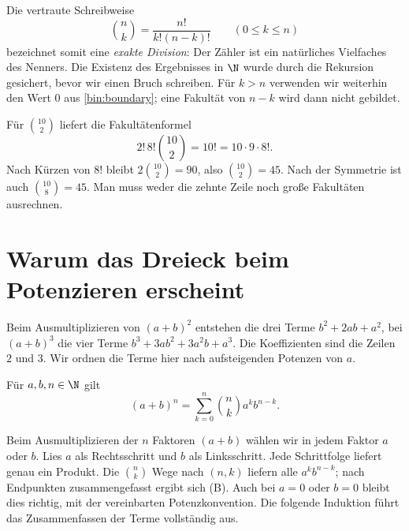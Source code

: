 Die vertraute Schreibweise
\[
 \binom nk=\frac{n!}{k!(n-k)!}\qquad(0\le k\le n)
\]
bezeichnet somit eine \emph{exakte Division}: Der Zähler ist ein
natürliches Vielfaches des Nenners. Die Existenz des Ergebnisses in
$\N$ wurde durch die Rekursion gesichert, bevor wir einen Bruch schreiben.
Für $k>n$ verwenden wir weiterhin den Wert $0$ aus \eqref{bin:boundary};
eine Fakultät von $n-k$ wird dann nicht gebildet.

\begin{beispiel}
Für $\binom{10}2$ liefert die Fakultätenformel
\[
 2!\,8!\binom{10}2=10!=10\cdot9\cdot8!.
\]
Nach Kürzen von $8!$ bleibt $2\binom{10}2=90$, also
$\binom{10}2=45$. Nach der Symmetrie ist auch $\binom{10}8=45$.
Man muss weder die zehnte Zeile noch große Fakultäten ausrechnen.
\end{beispiel}

\section{Warum das Dreieck beim Potenzieren erscheint}
\label{bin:theorem}

Beim Ausmultiplizieren von $(a+b)^2$ entstehen die drei Terme
$b^2+2ab+a^2$, bei $(a+b)^3$ die vier Terme
$b^3+3ab^2+3a^2b+a^3$. Die Koeffizienten sind die Zeilen $2$ und $3$.
Wir ordnen die Terme hier nach aufsteigenden Potenzen von $a$.

\begin{satz}
Für $a,b,n\in\N$ gilt
\begin{equation}\tag{B}\label{bin:binomial-theorem}
 \boxed{\displaystyle
 (a+b)^n=\sum_{k=0}^n\binom nk a^k b^{n-k}.}
\end{equation}
\end{satz}

\Beweisidee Beim Ausmultiplizieren der $n$ Faktoren $(a+b)$ wählen wir
in jedem Faktor $a$ oder $b$. Lies $a$ als Rechtsschritt und $b$ als
Linksschritt. Jede Schrittfolge liefert genau ein Produkt. Die
$\binom nk$ Wege nach $(n,k)$ liefern alle $a^kb^{n-k}$; nach Endpunkten
zusammengefasst ergibt sich (B). Auch bei $a=0$ oder $b=0$ bleibt dies
richtig, mit der vereinbarten Potenzkonvention. Die folgende Induktion
führt das Zusammenfassen der Terme vollständig aus.

